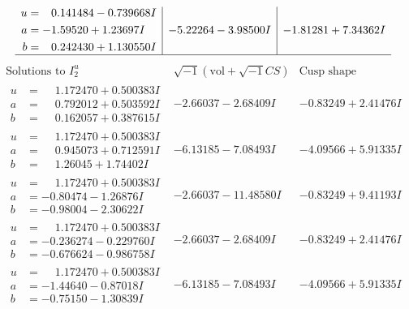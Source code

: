 \documentclass[1p]{elsarticle_modified}
\theoremstyle{definition}
\newcommand{\I}{\sqrt{-1}}
\begin{document}
$$\begin{array}{c|c|c}
\begin{aligned}
u &= \phantom{-}0.141484 - 0.739668 I \\
a &= -1.59520 + 1.23697 I \\
b &= \phantom{-}0.242430 + 1.130550 I\end{aligned}
 & -5.22264 - 3.98500 I & -1.81281 + 7.34362 I\\
 \hline 
 \end{array}$$\newpage$$\begin{array}{c|c|c}  
\text{Solutions to }I^u_{2}& \I (\text{vol} + \sqrt{-1}CS) & \text{Cusp shape}\\
 \hline 
\begin{aligned}
u &= \phantom{-}1.172470 + 0.500383 I \\
a &= \phantom{-}0.792012 + 0.503592 I \\
b &= \phantom{-}0.162057 + 0.387615 I\end{aligned}
 & -2.66037 - 2.68409 I & -0.83249 + 2.41476 I \\ \hline\begin{aligned}
u &= \phantom{-}1.172470 + 0.500383 I \\
a &= \phantom{-}0.945073 + 0.712591 I \\
b &= \phantom{-}1.26045 + 1.74402 I\end{aligned}
 & -6.13185 - 7.08493 I & -4.09566 + 5.91335 I \\ \hline\begin{aligned}
u &= \phantom{-}1.172470 + 0.500383 I \\
a &= -0.80474 - 1.26876 I \\
b &= -0.98004 - 2.30622 I\end{aligned}
 & -2.66037 - 11.48580 I & -0.83249 + 9.41193 I \\ \hline\begin{aligned}
u &= \phantom{-}1.172470 + 0.500383 I \\
a &= -0.236274 - 0.229760 I \\
b &= -0.676624 - 0.986758 I\end{aligned}
 & -2.66037 - 2.68409 I & -0.83249 + 2.41476 I \\ \hline\begin{aligned}
u &= \phantom{-}1.172470 + 0.500383 I \\
a &= -1.44640 - 0.87018 I \\
b &= -0.75150 - 1.30839 I\end{aligned}
 & -6.13185 - 7.08493 I & -4.09566 + 5.91335 I \\ \hline\begin{aligned}

\end{aligned}
\end{array}$$
\end{document}
